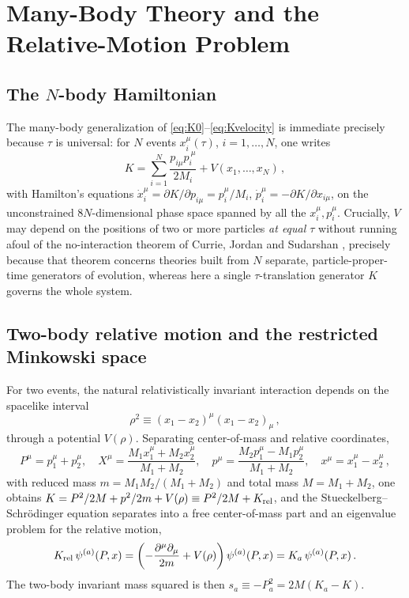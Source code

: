 \documentclass[11pt]{article}
\begin{document}
\section{Many-Body Theory and the Relative-Motion Problem}
\label{sec:manybody}

\subsection{The $N$-body Hamiltonian}

The many-body generalization of \eqref{eq:K0}--\eqref{eq:Kvelocity} is
immediate precisely because $\tau$ is universal: for $N$ events
$x_i^\mu(\tau)$, $i=1,\dots,N$, one writes
\begin{equation}
K=\sum_{i=1}^{N}\frac{p_{i\mu}p_i^{\ \mu}}{2M_i}+V(x_1,\dots,x_N)\,,
\label{eq:Kmanybody}
\end{equation}
with Hamilton's equations $\dot x_i^\mu=\partial K/\partial p_{i\mu}=p_i^\mu/M_i$,
$\dot p_i^\mu=-\partial K/\partial x_{i\mu}$, on the unconstrained $8N$-dimensional
phase space spanned by all the $x_i^\mu,p_i^\mu$. Crucially, $V$ may depend on
the positions of two or more particles \emph{at equal $\tau$} without running
afoul of the no-interaction theorem of Currie, Jordan and Sudarshan
\cite{CurrieJordanSudarshan1963}, precisely because that theorem concerns
theories built from $N$ separate, particle-proper-time generators of evolution,
whereas here a single $\tau$-translation generator $K$ governs the whole
system.

\subsection{Two-body relative motion and the restricted Minkowski space}
\label{sec:RMS}

For two events, the natural relativistically invariant interaction depends on
the spacelike interval
\begin{equation}
\rho^2\equiv(x_1-x_2)^\mu(x_1-x_2)_\mu\,,
\label{eq:rho2}
\end{equation}
through a potential $V(\rho)$. Separating center-of-mass and relative
coordinates,
\begin{equation}
P^\mu=p_1^\mu+p_2^\mu,\quad
X^\mu=\frac{M_1x_1^\mu+M_2x_2^\mu}{M_1+M_2},\quad
p^\mu=\frac{M_2p_1^\mu-M_1p_2^\mu}{M_1+M_2},\quad
x^\mu=x_1^\mu-x_2^\mu\,,
\label{eq:cmrelative}
\end{equation}
with reduced mass $m=M_1M_2/(M_1+M_2)$ and total mass $M=M_1+M_2$, one obtains
$K=P^2/2M+p^2/2m+V(\rho)\equiv P^2/2M+K_{\rm rel}$, and the
Stueckelberg--Schr\"odinger equation separates into a free center-of-mass part
and an eigenvalue problem for the relative motion,
\begin{equation}
K_{\rm rel}\,\psi^{(a)}(P,x)=\left(-\frac{\partial^\mu\partial_\mu}{2m}+V(\rho)\right)\psi^{(a)}(P,x)=K_a\,\psi^{(a)}(P,x)\,.
\label{eq:relativeeigen}
\end{equation}
The two-body invariant mass squared is then $s_a\equiv -P_a^2=2M(K_a-K)$.
\end{document}
